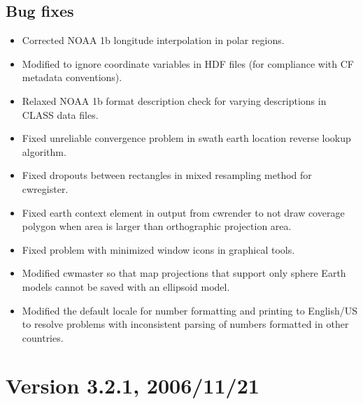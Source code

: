 \subsection*{Bug fixes}
\begin{itemize}

  \item Corrected NOAA 1b longitude interpolation in polar regions.

  \item Modified to ignore coordinate variables in HDF files (for
  compliance with CF metadata conventions).

  \item Relaxed NOAA 1b format description check for varying
  descriptions in CLASS data files.

  \item Fixed unreliable convergence problem in swath earth location
  reverse lookup algorithm.

  \item Fixed dropouts between rectangles in mixed resampling method
  for cwregister.

  \item Fixed earth context element in output from cwrender to not
  draw coverage polygon when area is larger than orthographic
  projection area.

  \item Fixed problem with minimized window icons in graphical tools.

  \item Modified cwmaster so that map projections that support only
  sphere Earth models cannot be saved with an ellipsoid model.

  \item Modified the default locale for number formatting and printing
  to English/US to resolve problems with inconsistent parsing of
  numbers formatted in other countries.

\end{itemize}




\section*{Version 3.2.1, 2006/11/21}
  
